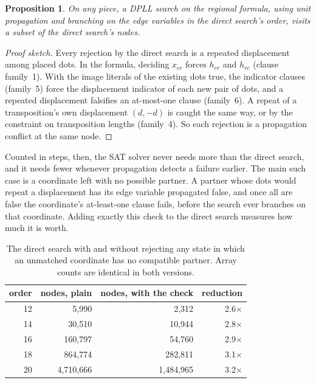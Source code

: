 \documentclass[11pt,a4paper]{article}
\newtheorem{proposition}[theorem]{Proposition}
\theoremstyle{definition}
\begin{document}
\begin{proposition}\label{prop:simulation}
On any piece, a DPLL search on the regional formula, using unit propagation and branching on the
edge variables in the direct search's order, visits a subset of the direct search's nodes.
\end{proposition}
\begin{proof}[Proof sketch]
Every rejection by the direct search is a repeated displacement among placed dots. In the
formula, deciding $x_{cr}$ forces $h_{cr}$ and $h_{rc}$ (clause family~1). With the image literals
of the existing dots true, the indicator clauses (family~5) force the displacement indicator of
each new pair of dots, and a repeated displacement falsifies an at-most-one clause (family~6).
A repeat of a transposition's own displacement $(d,-d)$ is caught the same way, or by the
constraint on transposition lengths (family~4). So each rejection is a propagation conflict at
the same node.
\end{proof}

Counted in steps, then, the SAT solver never needs more than the direct search, and it needs fewer
whenever propagation detects a failure earlier. The main such case is a coordinate left with no
possible partner. A partner whose dots would repeat a displacement has its edge variable propagated
false, and once all are false the coordinate's at-least-one clause fails, before the search ever
branches on that coordinate. Adding exactly this check to the direct search measures how much it
is worth.

\begin{table}[H]
\centering
\begin{tabular}{@{}rrrr@{}}
\toprule
order & nodes, plain & nodes, with the check & reduction \\
\midrule
12 & 5{,}990 & 2{,}312 & 2.6$\times$ \\
14 & 30{,}510 & 10{,}944 & 2.8$\times$ \\
16 & 160{,}797 & 54{,}760 & 2.9$\times$ \\
18 & 864{,}774 & 282{,}811 & 3.1$\times$ \\
20 & 4{,}710{,}666 & 1{,}484{,}965 & 3.2$\times$ \\
\bottomrule
\end{tabular}
\caption{The direct search with and without rejecting any state in which an unmatched coordinate
has no compatible partner. Array counts are identical in both versions.}
\label{tab:wipeout}
\end{table}
\end{document}
